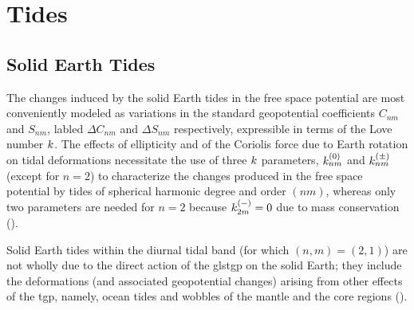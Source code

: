 \chapter{Tides}
\label{ch:tides}

\section{Solid Earth Tides}
\label{sec:solid-earth-tides}
The changes induced by the solid Earth tides in the free space potential are 
most conveniently modeled as variations in the standard geopotential 
coefficients $C_{nm}$ and $S_{nm}$, labled $\Delta C_{nm}$ and $\Delta S_{nm}$ 
respectively, expressible in terms of the Love number $k$. The effects of 
ellipticity and of the Coriolis force due to Earth rotation on tidal 
deformations necessitate the use of three $k$ parameters, $k ^{(0)}_{nm}$ 
and $k ^{(\pm)}_{nm}$ (except for $n = 2$) to characterize the
changes produced in the free space potential by tides of spherical harmonic 
degree and order $(nm)$, whereas only two parameters are needed for $n = 2$ 
because $k ^{(-)}_{2m} = 0$ due to mass conservation (\cite{iers2010}).

Solid Earth tides within the diurnal tidal band (for which $(n,m) = (2,1)$) are 
not wholly due to the direct action of the gls{tgp} on the solid Earth; they 
include the deformations (and associated geopotential changes) arising from 
other effects of the \gls{tgp}, namely, ocean tides and wobbles of the mantle 
and the core regions (\cite{iers2010}).

